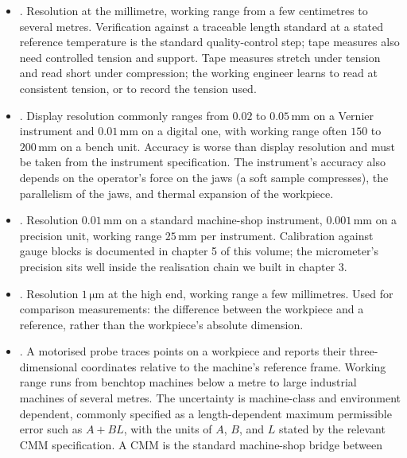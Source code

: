\begin{itemize}[leftmargin=*]
  \item {}. Resolution at the
    millimetre, working range from a few centimetres to several
    metres. Verification against a traceable length standard at a
    stated reference temperature is the standard quality-control step;
    tape measures also need controlled tension and support. Tape
    measures stretch under tension and read short under compression;
    the working engineer learns to read at consistent tension, or to
    record the tension used.
  \item {}. Display resolution commonly
    ranges from $0.02$ to $0.05 \,\si{\milli\meter}$ on a Vernier
    instrument and $0.01 \,\si{\milli\meter}$ on a digital one, with
    working range often $150$ to $200 \,\si{\milli\meter}$ on a bench
    unit. Accuracy is worse than display resolution and must be taken
    from the instrument specification. The instrument's accuracy also
    depends on the operator's force on the jaws (a soft sample
    compresses), the parallelism of the jaws, and thermal expansion
    of the workpiece.
  \item {}. Resolution $0.01 \,\si{\milli
    \meter}$ on a standard machine-shop instrument, $0.001 \,\si
    {\milli\meter}$ on a precision unit, working range $25 \,\si
    {\milli\meter}$ per instrument. Calibration against gauge blocks
    is documented in chapter 5 of this volume; the micrometer's
    precision sits well inside the realisation chain we built in
    chapter 3.
  \item {}. Resolution
    $1 \,\si{\micro\meter}$ at the high end, working range a few
    millimetres. Used for comparison measurements: the difference
    between the workpiece and a reference, rather than the workpiece's
    absolute dimension.
  \item {}. A motorised
    probe traces points on a workpiece and reports their three-
    dimensional coordinates relative to the machine's reference
    frame. Working range runs from benchtop machines below a metre
    to large industrial machines of several metres. The uncertainty
    is machine-class and environment dependent, commonly specified as
    a length-dependent maximum permissible error such as $A + B L$,
    with the units of $A$, $B$, and $L$ stated by the relevant CMM
    specification. A CMM is the standard machine-shop bridge between

\end{itemize}

